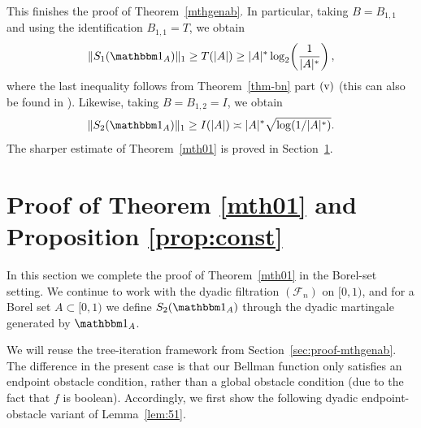 \documentclass[11pt]{amsart}
\theoremstyle{definition}
\renewcommand{\1}{{\mathbbm{1}}}
\begin{document}
This finishes the proof of Theorem~\ref{mthgenab}. In particular, taking
$B=B_{1,1}$ and using the identification $B_{1,1}=T$, we obtain
\[
\|S_1(\mathbbm 1_A)\|_1 \ge T(|A|)\ge |A|^*\log_2\!\left(\frac{1}{|A|^*}\right),
\]
where the last inequality follows from Theorem~\ref{thm-bn} part $\textup{(v)}$ 
(this can also be found in \cite{Lev}).
Likewise, taking $B=B_{1,2}=I$, we obtain
\[
\|S_2(\mathbbm 1_A)\|_1 \ge I(|A|)\asymp |A|^*\sqrt{\log(1/|A|^*)}.
\]
The sharper estimate of Theorem~\ref{mth01} is proved in
Section~\ref{sec:proof-mth01}.





















































\section{Proof of Theorem \ref{mth01} and Proposition \ref{prop:const}}\label{sec:proof-mth01} 

In this section we complete the proof of Theorem~\ref{mth01} in the Borel-set setting. We continue to work with the dyadic filtration $(\mathcal F_n)$ on {$[0,1)$}, and for a Borel set $A\subset{[0,1)}$ we define $S_2(\mathbbm 1_A)$ through the dyadic martingale generated by $\mathbbm 1_A$.

We will reuse the tree-iteration framework from Section~\ref{sec:proof-mthgenab}. 
The difference in the present case is that our Bellman function only satisfies an endpoint obstacle condition, rather than a global obstacle condition (due to the fact that $f$ is boolean). 
Accordingly, we first show the following dyadic endpoint-obstacle variant of Lemma~\ref{lem:51}.
\end{document}
